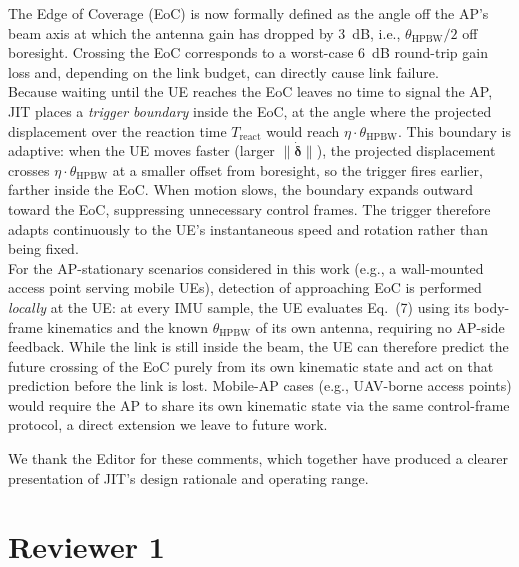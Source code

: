 \documentclass{article}
\begin{document}
\noindent The Edge of Coverage (EoC) is now formally defined as the angle off the AP's beam axis at which the antenna gain has dropped by \SI{3}{\deci\bel}, i.e., $\theta_{\text{HPBW}}/2$ off boresight. Crossing the EoC corresponds to a worst-case \SI{6}{\deci\bel} round-trip gain loss and, depending on the link budget, can directly cause link failure.\\

\noindent Because waiting until the UE reaches the EoC leaves no time to signal the AP, JIT places a \emph{trigger boundary} inside the EoC, at the angle where the projected displacement over the reaction time $T_{\text{react}}$ would reach $\eta \cdot \theta_{\text{HPBW}}$. This boundary is adaptive: when the UE moves faster (larger $\|\dot{\boldsymbol\delta}\|$), the projected displacement crosses $\eta \cdot \theta_{\text{HPBW}}$ at a smaller offset from boresight, so the trigger fires earlier, farther inside the EoC. When motion slows, the boundary expands outward toward the EoC, suppressing unnecessary control frames. The trigger therefore adapts continuously to the UE's instantaneous speed and rotation rather than being fixed.\\

\noindent For the AP-stationary scenarios considered in this work (e.g., a wall-mounted access point serving mobile UEs), detection of approaching EoC is performed \emph{locally} at the UE: at every IMU sample, the UE evaluates Eq.~(7) using its body-frame kinematics and the known $\theta_{\text{HPBW}}$ of its own antenna, requiring no AP-side feedback. While the link is still inside the beam, the UE can therefore predict the future crossing of the EoC purely from its own kinematic state and act on that prediction before the link is lost. Mobile-AP cases (e.g., UAV-borne access points) would require the AP to share its own kinematic state via the same control-frame protocol, a direct extension we leave to future work.

\bigskip
\noindent We thank the Editor for these comments, which together have produced a clearer presentation of JIT's design rationale and operating range.

\newpage

\section*{Reviewer 1}
\end{document}
